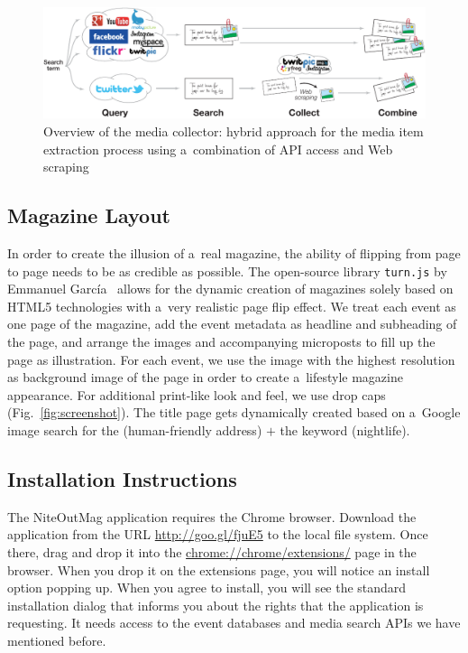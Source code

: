 \documentclass[runningheads,a4paper]{llncs}
\begin{document}
{\begin{figure}[b!]
\centering
\includegraphics[width=0.8\linewidth]{./architecture.pdf}
\caption{Overview of the media collector: hybrid approach for the media item extraction process using a~combination of API access and Web scraping}
\label{fig:architecture}
\end{figure}

\subsection{Magazine Layout} \label{sec:magazine-layout}
In order to create the illusion of a~real magazine, the ability of flipping from page to page needs to be as credible as possible. The open-source library \texttt{turn.js} by Emmanuel García~\cite{TurnJs2012} allows for the dynamic creation of magazines solely based on HTML5 technologies with a~very realistic page flip effect. We treat each event as one page of the magazine, add the event metadata as headline and subheading of the page, and arrange the images and accompanying microposts to fill up the page as illustration. For each event, we use the image with the highest resolution as background image of the page in order to create a~lifestyle magazine appearance. For additional print-like look and feel, we use drop caps (Fig.~\ref{fig:screenshot}). The title page gets dynamically created based on a~Google image search for the (human-friendly address) $+$ the keyword (nightlife).

\subsection{Installation Instructions}
The NiteOutMag application requires the Chrome browser. Download the application from the URL \url{http://goo.gl/fjuE5} to the local file system.
Once there, drag and drop it into the \url{chrome://chrome/extensions/} page in the browser. When you drop it on the extensions page, you will notice an install option popping up. When you agree to install, you will see the standard installation dialog that informs you about the rights that the application is requesting. It needs access to the event databases and media search APIs we have mentioned before.

}
\end{document}
